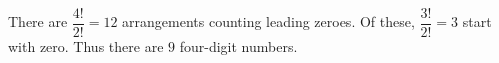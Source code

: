 There are $\dfrac{4!}{2!}=12$ arrangements counting leading zeroes. Of these, $\dfrac{3!}{2!}=3$ start with zero. Thus there are $\boxed9$ four-digit numbers.
